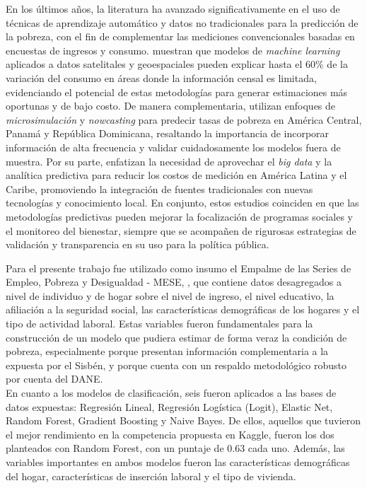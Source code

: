 \documentclass[12pt,a4paper,onecolumn]{article}
\begin{document}
En los últimos años, la literatura ha avanzado significativamente en el uso de técnicas de aprendizaje automático y datos no tradicionales para la predicción de la pobreza, con el fin de complementar las mediciones convencionales basadas en encuestas de ingresos y consumo. \citet{WorldBank2017} muestran que modelos de \textit{machine learning} aplicados a datos satelitales y geoespaciales pueden explicar hasta el 60\% de la variación del consumo en áreas donde la información censal es limitada, evidenciando el potencial de estas metodologías para generar estimaciones más oportunas y de bajo costo. De manera complementaria, \citet{IDB2024} utilizan enfoques de \textit{microsimulación} y \textit{nowcasting} para predecir tasas de pobreza en América Central, Panamá y República Dominicana, resaltando la importancia de incorporar información de alta frecuencia y validar cuidadosamente los modelos fuera de muestra. Por su parte, \citet{IDB2018} enfatizan la necesidad de aprovechar el \textit{big data} y la analítica predictiva para reducir los costos de medición en América Latina y el Caribe, promoviendo la integración de fuentes tradicionales con nuevas tecnologías y conocimiento local. En conjunto, estos estudios coinciden en que las metodologías predictivas pueden mejorar la focalización de programas sociales y el monitoreo del bienestar, siempre que se acompañen de rigurosas estrategias de validación y transparencia en su uso para la política pública.


Para el presente trabajo fue utilizado como insumo el Empalme de las Series de Empleo, Pobreza y Desigualdad - MESE, \citep{dane2018pobreza}, que contiene datos desagregados a nivel de individuo y de hogar sobre el nivel de ingreso, el nivel educativo, la afiliación a la seguridad social, las características demográficas de los hogares y el tipo de actividad laboral. Estas variables fueron fundamentales para la construcción de un modelo que pudiera estimar de forma veraz la condición de pobreza, especialmente porque presentan información complementaria a la expuesta por el Sisbén, y porque cuenta con un respaldo metodológico robusto por cuenta del DANE.\\

En cuanto a los modelos de clasificación, seis fueron aplicados a las bases de datos expuestas: Regresión Lineal, Regresión Logística (Logit), Elastic Net, Random Forest, Gradient Boosting y Naive Bayes. De ellos, aquellos que tuvieron el mejor rendimiento en la competencia propuesta en Kaggle, fueron los dos planteados con Random Forest, con un puntaje de 0.63 cada uno. Además, las variables importantes en ambos modelos fueron las características demográficas del hogar, características de inserción laboral y el tipo de vivienda.\\
\end{document}
